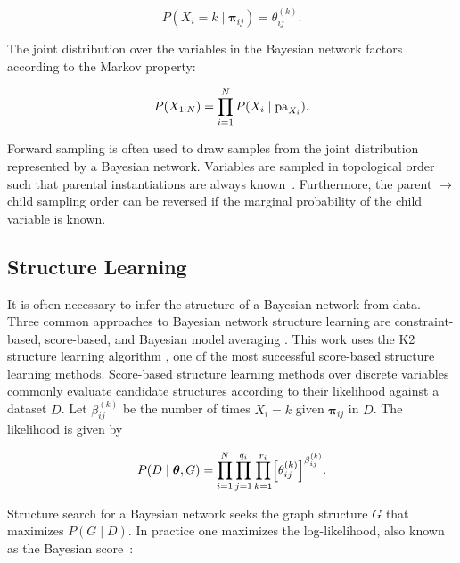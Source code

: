 \begin{equation}
P(X_i = k \mid \bm{\pi}_{ij}) = \theta_{ij}^{(k)}\text{.}
\end{equation}

The joint distribution over the variables in the Bayesian network factors according to the Markov property:

\begin{equation}
P(X_{1:N}) = \prod_{i=1}^N P(X_i \mid \operatorname{pa}_{X_i})\text{.}
\end{equation}

Forward sampling is often used to draw samples from the joint distribution represented by a Bayesian network.
Variables are sampled in topological order such that parental instantiations are always known~\citep{PGM_2009}.
Furthermore, the parent $\rightarrow$ child sampling order can be reversed if the marginal probability of the child variable is known.


\subsection{Structure Learning}

It is often necessary to infer the structure of a Bayesian network from data.
Three common approaches to Bayesian network structure learning are constraint-based, score-based, and Bayesian model averaging \citep[see][chap.~18]{PGM_2009}.
This work uses the K2 structure learning algorithm \citep{K2}, one of the most successful score-based structure learning methods.
Score-based structure learning methods over discrete variables commonly evaluate candidate structures according to their likelihood against a dataset $D$.
Let $\beta_{ij}^{(k)}$ be the number of times $X_i = k$ given $\bm{\pi}_{ij}$ in $D$.
The likelihood is given by

\begin{equation}
P(D\mid \bm{\theta}, G) = \prod_{i=1}^N \prod_{j=1}^{q_i} \prod_{k=1}^{r_i} \brock{\theta_{ij}^{(k)}}^{\beta_{ij}^{(k)}}\text{.}
\end{equation}


Structure search for a Bayesian network seeks the graph structure $G$ that maximizes ${P(G\mid D)}$.
In practice one maximizes the log-likelihood, also known as the Bayesian score~\cite{cooper1992bayesian}:

